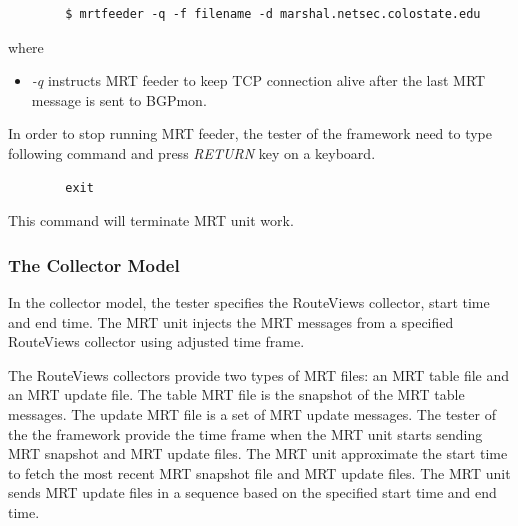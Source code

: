 \begin{verbatim}
        $ mrtfeeder -q -f filename -d marshal.netsec.colostate.edu
\end{verbatim}
where
\begin{itemize}
\item{\emph{-q} instructs MRT feeder to keep TCP connection alive after the last MRT message is sent to BGPmon. } 
\end{itemize}

In order to stop running MRT feeder, the tester of the framework need to type following command and  press \emph{RETURN} key on a keyboard. 
\begin{verbatim}
        exit
\end{verbatim}

This command will terminate MRT unit work. 



\subsubsection{The Collector Model}


In the collector model, the tester specifies the RouteViews collector, start time and end time.  The MRT unit injects the MRT messages from a specified RouteViews collector using adjusted time frame.

The RouteViews collectors provide two types of MRT files: an MRT table file and an MRT update file.  The table MRT file is the snapshot of the MRT table messages. 
The update MRT file is a  set of MRT update messages. 
The tester of the the framework provide the time frame when the MRT unit starts sending MRT snapshot and MRT update files.  The MRT unit approximate the start time to fetch the most recent   MRT snapshot file and MRT update files.  The MRT unit sends  MRT update files in a sequence based on the specified start time and end time.   

 

